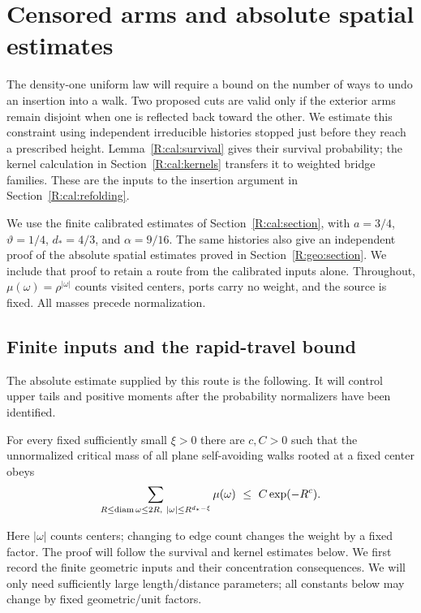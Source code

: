 \section{Censored arms and absolute spatial estimates}\label{R:cal:geometry-section}
The density-one uniform law will require a bound on the number of ways to
undo an insertion into a walk. Two proposed cuts are valid only if the
exterior arms remain disjoint when one is reflected back toward the other. We estimate this
constraint using independent irreducible histories stopped just before
they reach a prescribed height. Lemma~\ref{R:cal:survival} gives their
survival probability; the kernel calculation in
Section~\ref{R:cal:kernels} transfers it to weighted bridge families.
These are the inputs to the insertion argument in
Section~\ref{R:cal:refolding}.

We use the finite calibrated estimates of Section~\ref{R:cal:section},
with $a=3/4$, $\vartheta=1/4$, $d_*=4/3$, and $\alpha=9/16$.
The same histories also give an independent proof of the absolute
spatial estimates proved in Section~\ref{R:geo:section}. We include that
proof to retain a route from the calibrated inputs alone. Throughout,
$\mu(\omega)=\rho^{|\omega|}$ counts visited centers, ports carry no
weight, and the source is fixed. All masses precede normalization.

\subsection{Finite inputs and the rapid-travel bound}\label{R:cal:fast-section}

The absolute estimate supplied by this route is the following. It will
control upper tails and positive moments after the probability
normalizers have been identified.
\begin{theorem}\label{R:cal:fast}
For every fixed sufficiently small $\xi>0$ there are $c,C>0$ such that the unnormalized critical mass of all plane self-avoiding walks rooted at a fixed center obeys
\begin{equation}
 \sum_{R\le {\rm diam}\,\omega\le 2R,\ |\omega|\le R^{d_*-\xi}}\mu(\omega)
       \ \le\ C\exp(-R^c).                                                   \label{R:cal:fast-mass}
\end{equation}
\end{theorem}
Here $|\omega|$ counts centers; changing to edge count changes the weight by a fixed factor. The proof will follow the survival and kernel estimates below. We first record the finite geometric inputs and their concentration consequences.
We will only need sufficiently large length/distance parameters; all constants below may change by fixed geometric/unit factors.


